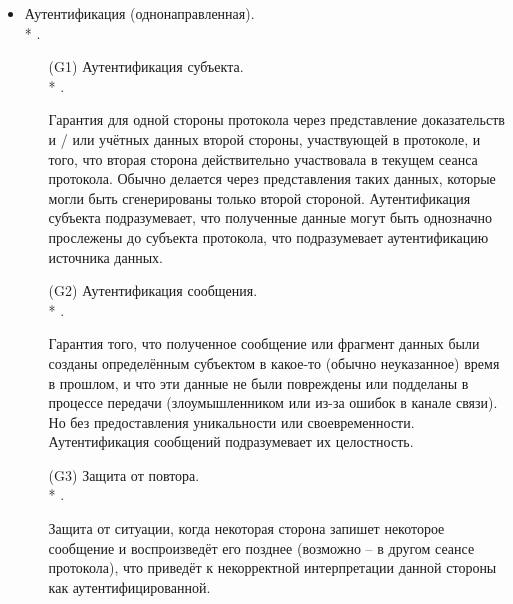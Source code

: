 \begin{itemize}
	\item Аутентификация (однонаправленная).\\*
		.
	\begin{itemize}
		\item[(G1)] Аутентификация субъекта.\\*
			.
		\item[{}] Гарантия для одной стороны протокола через представление доказательств и / или учётных данных второй стороны, участвующей в протоколе, и того, что вторая сторона действительно участвовала в текущем сеанса протокола. Обычно делается через представления таких данных, которые могли быть сгенерированы только второй стороной. Аутентификация субъекта подразумевает, что полученные данные могут быть однозначно прослежены до субъекта протокола, что подразумевает аутентификацию источника данных.
		\item[(G2)] Аутентификация сообщения.\\*
			.
		\item[{}] Гарантия того, что полученное сообщение или фрагмент данных были созданы определённым субъектом в какое-то (обычно неуказанное) время в прошлом, и что эти данные не были повреждены или подделаны в процессе передачи (злоумышленником или из-за ошибок в канале связи). Но без предоставления уникальности или своевременности. Аутентификация сообщений подразумевает их целостность.
		\item[(G3)] Защита от повтора.\\*
			.
		\item[{}] Защита от ситуации, когда некоторая сторона запишет некоторое сообщение и воспроизведёт его позднее (возможно -- в другом сеансе протокола), что приведёт к некорректной интерпретации данной стороны как аутентифицированной.
	\end{itemize}


\end{itemize}
